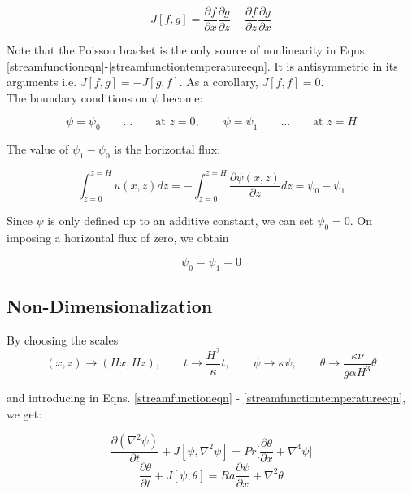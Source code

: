 \documentclass[paper=a4, fontsize=11pt]{scrartcl}
\numberwithin{equation}{section}		%
\numberwithin{figure}{section}			%
\numberwithin{table}{section}				%
\begin{document}
\begin{equation}
	J[f,g] = \frac{\partial f}{\partial x}\frac{\partial g}{\partial z} - 
	\frac{\partial f}{\partial z}\frac{\partial g}{\partial x}
\end{equation}

Note that the Poisson bracket is the only source of nonlinearity in Eqns. \ref{streamfunctioneqn}-\ref{streamfunctiontemperatureeqn}. It is antisymmetric in its arguments i.e. $J[f,g] = - J[g,f]$. As a corollary, $J[f,f] = 0$. \\

\noindent The boundary conditions on $\psi$ become:

\begin{equation}
	\psi = \psi_0 \qquad ... \qquad \text{at } z = 0, \qquad \psi = \psi_1 \qquad ... \qquad \text{at } z = H
	\label{temperaturebc}
\end{equation}

\noindent The value of $\psi_1 - \psi_0$ is the horizontal flux:

\begin{equation}
	\int_{z=0}^{z=H} u(x,z) dz = - \int_{z=0}^{z=H} \frac{\partial \psi(x,z)}{\partial z} dz =  \psi_0 - \psi_1
\end{equation}

Since $\psi$ is only defined up to an additive constant, we can set $\psi_0 = 0$. On imposing a horizontal flux of zero, we obtain 

\begin{equation}
	\psi_0 = \psi_1 = 0
	\label{streamfunctionbc}
\end{equation}

\subsection{Non-Dimensionalization}

By choosing the scales 
\begin{equation}
	(x,z) \rightarrow (Hx, Hz), \qquad t \rightarrow \frac{H^2}{\kappa}t, \qquad \psi \rightarrow \kappa \psi , \qquad \theta \rightarrow \frac{\kappa \nu}{g \alpha H^3} \theta
\end{equation}

\noindent and introducing in Eqns. \ref{streamfunctioneqn} - \ref{streamfunctiontemperatureeqn}, we get:

\begin{equation}
	\frac{\partial (\nabla^2 \psi)}{\partial t} + J[\psi, \nabla^2 \psi] = Pr \biggl[\frac{\partial \theta}{\partial x} + \nabla^4 \psi\biggr]
	\label{ndstreamfunctioneqn}
\end{equation}	 
\begin{equation}
	\frac{\partial \theta}{\partial t} + J[\psi, \theta] = Ra \frac{\partial\psi}{\partial x} +  \nabla^2 \theta 
	\label{ndtemperatureeqn}
\end{equation}
\end{document}
